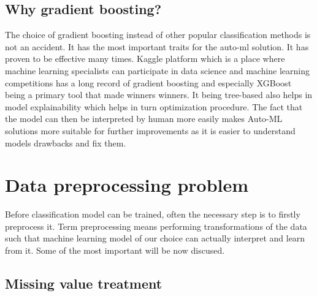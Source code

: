 \documentclass[a4paper,twoside,12pt]{book}
\begin{document}
\subsection{Why gradient boosting?}

The choice of gradient boosting instead of other popular classification methods is not an accident. It has the most important traits for the auto-ml solution. It has proven to be effective many times. Kaggle platform which is a place where machine learning specialists can participate in data science and machine learning competitions has a long record of gradient boosting and especially XGBoost being a primary tool that made winners winners. 
It being tree-based also helps in model explainability which helps in turn optimization procedure. The fact that the model can then be interpreted by human more easily makes Auto-ML solutions more suitable for further improvements as it is easier to understand models drawbacks and fix them.


\section{Data preprocessing problem}

Before classification model can be trained, often the necessary step is to firstly preprocess it. Term preprocessing means performing transformations of the data such that machine learning model of our choice can actually interpret and learn from it. Some of the most important will be now discused.

\subsection{Missing value treatment}
\end{document}
